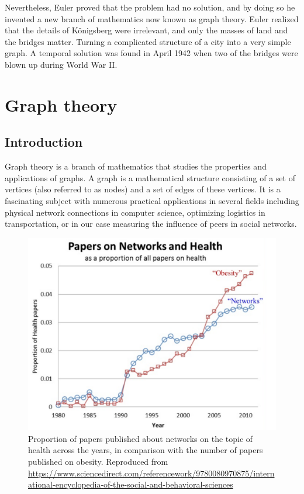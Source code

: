 Nevertheless, Euler proved that the problem had no solution, and by doing so he invented a new branch of mathematics now known as graph theory. Euler realized that the details of Königsberg were irrelevant, and only the masses of land and the bridges matter. Turning a complicated structure of a city into a very simple graph. A temporal solution was found in April 1942 when two of the bridges were blown up during World War II.



\section{Graph theory}

\subsection{Introduction}

Graph theory is a branch of mathematics that studies the properties and applications of graphs. A graph is a mathematical structure consisting of a set of vertices (also referred to as nodes) and a set of edges of these vertices. It is a fascinating subject with numerous practical applications in several fields including physical network connections in computer science, optimizing logistics in transportation, or in our case measuring the influence of peers in social networks.

    \begin{figure}[H]
        \centering
            \includegraphics[width=0.7\linewidth]{figures/Networks/papersSocial.png} 
        \caption{Proportion of papers published about networks on the topic of health across the years, in comparison with the number of papers published on obesity. Reproduced from \url{https://www.sciencedirect.com/referencework/9780080970875/international-encyclopedia-of-the-social-and-behavioral-sciences}}
        \label{figure:networkNetworkRise}
    \end{figure}


